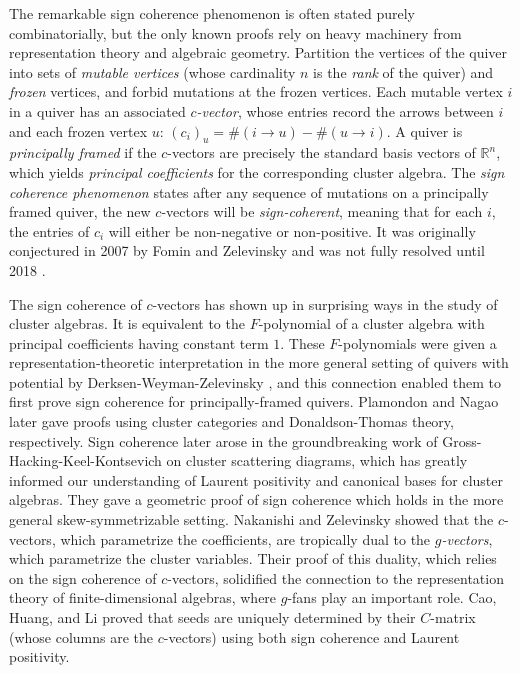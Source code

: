 \documentclass[12pt]{amsart}
\theoremstyle{definition}
\theoremstyle{remark}
\numberwithin{equation}{section}
\begin{document}
The remarkable sign coherence phenomenon is often stated purely combinatorially, but the only known proofs rely on heavy machinery from representation theory and algebraic geometry. Partition the vertices of the quiver into sets of \emph{mutable vertices} (whose cardinality $n$ is the \emph{rank} of the quiver) and \emph{frozen} vertices, and forbid mutations at the frozen vertices. Each mutable vertex $i$ in a quiver has an associated \emph{$c$-vector}, whose entries record the arrows between $i$ and each frozen vertex $u$: $(c_i)_u = \# (i \rightarrow u) - \# (u \rightarrow i)$.
A quiver is \emph{principally framed} if the $c$-vectors are precisely the standard basis vectors of $\mathbb{R}^n$, which yields \emph{principal coefficients} for the corresponding cluster algebra. The \emph{sign coherence phenomenon} states after any sequence of mutations on a principally framed quiver, the new $c$-vectors will be \emph{sign-coherent}, meaning that for each $i$, the entries of $c_i$ will either be non-negative or non-positive.  It was originally conjectured in 2007 by Fomin and Zelevinsky \cite{FZiv} and was not fully resolved until 2018 \cite{GHKK}.

The sign coherence of $c$-vectors has shown up in surprising ways in the study of cluster algebras.  It is equivalent to the $F$-polynomial of a cluster algebra with principal coefficients having constant term $1$.  These $F$-polynomials were given a representation-theoretic interpretation in the more general setting of quivers with potential by Derksen-Weyman-Zelevinsky \cite{DWZ2}, and this connection enabled them to first prove sign coherence for principally-framed quivers.  Plamondon \cite{Plamondon} and Nagao \cite{Nagao} later gave proofs using cluster categories and Donaldson-Thomas theory, respectively. Sign coherence later arose in the groundbreaking work of Gross-Hacking-Keel-Kontsevich \cite{GHKK} on cluster scattering diagrams, which has greatly informed our understanding of Laurent positivity and canonical bases for cluster algebras.  They gave a geometric proof of sign coherence which holds in the more general skew-symmetrizable setting. Nakanishi and Zelevinsky \cite{NZ} showed that the $c$-vectors, which parametrize the coefficients, are tropically dual to the \emph{$g$-vectors}, which parametrize the cluster variables.  Their proof of this duality, which relies on the sign coherence of $c$-vectors, solidified the connection to the representation theory of finite-dimensional algebras, where $g$-fans play an important role.  Cao, Huang, and Li  \cite{CaoHuangLi} proved that seeds are uniquely determined by their $C$-matrix (whose columns are the $c$-vectors) using both sign coherence and Laurent positivity. 
\end{document}
